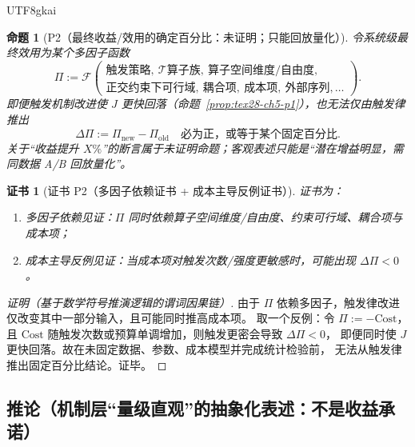 \documentclass[12pt]{article}
\newtheorem{proposition}{命题}[section]
\newtheorem{Certificate}{证书}[section]
\begin{document}
\begin{CJK*}{UTF8}{gkai}
\begin{proposition}[P2（最终收益/效用的确定百分比：未证明；只能回放量化）]
\label{prop:tex28-ch5-p2}
令系统级最终效用为某个多因子函数
\[
  \Pi := \mathcal{F}\!\left(
  \begin{array}{l}
    \text{触发策略},\ \mathcal{T}\text{算子族},\ \text{算子空间维度/自由度},\\
    \text{正交约束下可行域},\ \text{耦合项},\ \text{成本项},\ \text{外部序列},\dots
  \end{array}
  \right).
\]
即便触发机制改进使 $J$ 更快回落（命题~\ref{prop:tex28-ch5-p1}），也无法仅由触发律推出
\[
  \Delta \Pi := \Pi_{\mathrm{new}}-\Pi_{\mathrm{old}}
  \quad\text{必为正，或等于某个固定百分比}.
\]
关于“收益提升 $X\%$”的断言属于未证明命题；客观表述只能是“潜在增益明显，需同数据 A/B 回放量化”。
\end{proposition}

\begin{Certificate}[证书 P2（多因子依赖证书 + 成本主导反例证书）]
\label{cert:tex28-ch5-p2}
证书为：
\begin{enumerate}
  \item 多因子依赖见证：$\Pi$ 同时依赖算子空间维度/自由度、约束可行域、耦合项与成本项；
  \item 成本主导反例见证：当成本项对触发次数/强度更敏感时，可能出现 $\Delta\Pi<0$。
\end{enumerate}
\end{Certificate}

\begin{proof}[证明（基于数学符号推演逻辑的谓词因果链）]
由于 $\Pi$ 依赖多因子，触发律改进仅改变其中一部分输入，且可能同时推高成本项。
取一个反例：令 $\Pi:=-\mathrm{Cost}$，且 $\mathrm{Cost}$ 随触发次数或预算单调增加，则触发更密会导致 $\Delta\Pi<0$，
即便同时使 $J$ 更快回落。故在未固定数据、参数、成本模型并完成统计检验前，
无法从触发律推出固定百分比结论。证毕。
\end{proof}

\subsection{推论（机制层“量级直观”的抽象化表述：不是收益承诺）}
\label{subsec:tex28-ch5-corollaries}


\end{CJK*}
\end{document}
